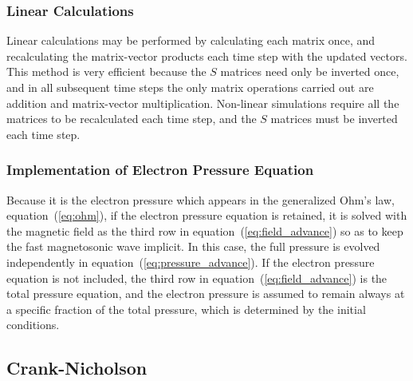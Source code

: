 \documentclass[letterpaper]{book}
\begin{document}
\subsubsection{Linear Calculations}

Linear calculations may be performed by calculating each matrix once,
and recalculating the matrix-vector products each time step with the
updated vectors.  This method is very efficient because the $S$
matrices need only be inverted once, and in all subsequent time steps
the only matrix operations carried out are addition and matrix-vector
multiplication.  Non-linear simulations require all the matrices to be
recalculated each time step, and the $S$ matrices must be inverted
each time step.

\subsubsection{Implementation of Electron Pressure Equation}

Because it is the electron pressure which appears in the generalized
Ohm's law, equation~(\ref{eq:ohm}), if the electron pressure equation
is retained, it is solved with the magnetic field as the third row in
equation~(\ref{eq:field_advance}) so as to keep the fast magnetosonic
wave implicit.  In this case, the full pressure is evolved
independently in equation~(\ref{eq:pressure_advance}).  If the
electron pressure equation is not included, the third row in
equation~(\ref{eq:field_advance}) is the total pressure equation, and
the electron pressure is assumed to remain always at a specific
fraction of the total pressure, which is determined by the initial
conditions.


\subsection{Crank-Nicholson}
\end{document}
